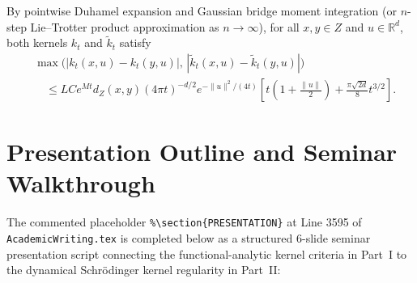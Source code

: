 \begin{theorem}
\begin{enumerate}
  By pointwise Duhamel expansion and Gaussian bridge moment integration (or $n$-step Lie--Trotter product approximation as $n \to \infty$), for all $x, y \in Z$ and $u \in \mathbb{R}^d$, both kernels $k_t$ and $\widetilde{k}_t$ satisfy
  \[
  \begin{aligned}
    &\max\bigl(|k_t(x, u) - k_t(y, u)|,\, |\widetilde{k}_t(x, u) - \widetilde{k}_t(y, u)|\bigr) \\
    &\quad \le L C e^{M t} d_Z(x, y) (4\pi t)^{-d/2} e^{-\|u\|^2/(4t)}
    \left[ t\left(1 + \frac{\|u\|}{2}\right) + \frac{\pi\sqrt{2d}}{8} t^{3/2} \right].
  \end{aligned}
  \]
\end{enumerate}
\end{theorem}

\section{Presentation Outline and Seminar Walkthrough}
\label{sec:completion_presentation}

The commented placeholder \texttt{\%\textbackslash section\{PRESENTATION\}} at Line 3595 of \texttt{AcademicWriting.tex} is completed below as a structured 6-slide seminar presentation script connecting the functional-analytic kernel criteria in Part~I to the dynamical Schr\"odinger kernel regularity in Part~II:

